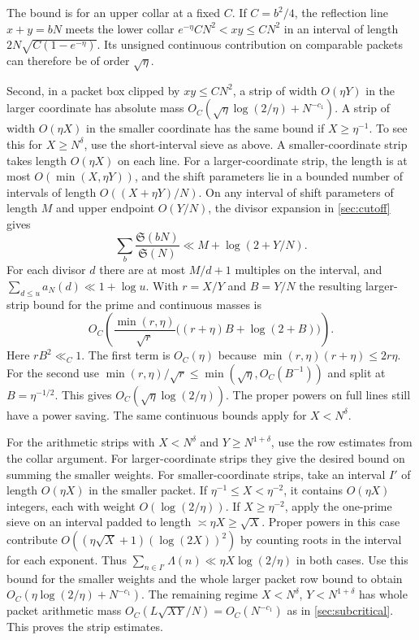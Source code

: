\documentclass[11pt,a4paper]{article}
\numberwithin{equation}{section}
\newcommand{\SSS}{\mathfrak S}
\begin{document}
The bound is for an upper collar at a fixed $C$. If
$C=b^2/4$, the reflection line $x+y=bN$ meets the lower
collar $e^{-\eta}CN^2<xy\le CN^2$ in an interval of length
$2N\sqrt{C(1-e^{-\eta})}$. Its unsigned continuous
contribution on comparable packets can therefore be of
order $\sqrt\eta$.

Second, in a packet box clipped by $xy\le CN^2$, a strip
of width $O(\eta Y)$ in the larger coordinate has absolute
mass $O_C(\sqrt\eta\log(2/\eta)+N^{-c_1})$.
A strip of width $O(\eta X)$ in the smaller coordinate has
the same bound if $X\ge\eta^{-1}$. To see this for
$X\ge N^\delta$, use the short-interval sieve as above.
A smaller-coordinate strip takes length $O(\eta X)$ on
each line. For a larger-coordinate strip, the length is at
most $O(\min(X,\eta Y))$, and the shift parameters lie in
a bounded number of intervals of length $O((X+\eta Y)/N)$.
On any interval of shift parameters of length $M$ and upper
endpoint $O(Y/N)$, the divisor expansion in
\cref{sec:cutoff} gives
\[
 \sum_b\frac{\SSS(bN)}{\SSS(N)}
   \ll M+\log(2+Y/N).
\]
For each divisor $d$ there are at most $M/d+1$ multiples on
the interval, and $\sum_{d\le u}a_N(d)\ll1+\log u$.
With $r=X/Y$ and $B=Y/N$ the resulting larger-strip bound
for the prime and continuous masses is
\[
 O_C\!\left(\frac{\min(r,\eta)}{\sqrt r}
                 \big((r+\eta)B+\log(2+B)\big)\right).
\]
Here $rB^2\ll_C1$. The first term is $O_C(\eta)$ because
$\min(r,\eta)(r+\eta)\le2r\eta$.
For the second use $\min(r,\eta)/\sqrt r\le
\min(\sqrt\eta,O_C(B^{-1}))$ and split at $B=\eta^{-1/2}$.
This gives $O_C(\sqrt\eta\log(2/\eta))$.
The proper powers on full lines still have a power saving.
The same continuous bounds apply for $X<N^\delta$.

For the arithmetic strips with $X<N^\delta$ and
$Y\ge N^{1+\delta}$, use the row estimates from the collar
argument. For larger-coordinate strips they give the
desired bound on summing the smaller weights. For
smaller-coordinate strips, take an interval $I'$ of
length $O(\eta X)$ in the smaller packet. If
$\eta^{-1}\le X<\eta^{-2}$, it contains $O(\eta X)$ integers,
each with weight $O(\log(2/\eta))$. If $X\ge\eta^{-2}$,
apply the one-prime sieve on an interval padded to length
$\asymp\eta X\ge\sqrt X$.
Proper powers in this case contribute
$O((\eta\sqrt X+1)(\log(2X))^2)$ by counting roots in
the interval for each exponent. Thus
$\sum_{n\in I'}\Lambda(n)\ll\eta X\log(2/\eta)$
in both cases. Use this bound for the smaller weights and
the whole larger packet row bound to obtain
$O_C(\eta\log(2/\eta)+N^{-c_1})$. The remaining regime
$X<N^\delta$, $Y<N^{1+\delta}$ has whole packet arithmetic
mass $O_C(L\sqrt{XY}/N)=O_C(N^{-c_1})$ as in
\cref{sec:subcritical}. This proves the strip estimates.
\end{document}
